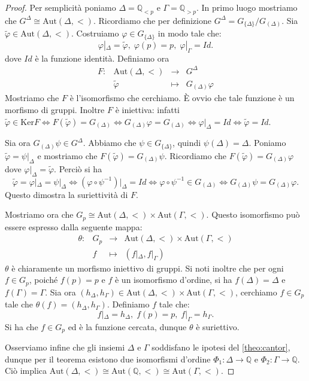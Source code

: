 \documentclass[12pt,a4paper,openright]{report}
\newcommand{\aut}{ \mathrm{Aut} ( \mathbb{Q},< ) } %
\newcommand{\Q}{\mathbb{Q}} %
\newcommand{\0}{\setminus\{0\}} %
\newcommand{\stab}[1]{G_{#1}}   %
\theoremstyle{definition}
\theoremstyle{plain}
\begin{document}
\begin{proof} Per semplicità poniamo $\Delta=\Q_{<p}$ e $\Gamma=\Q_{>p}$.
    In primo luogo mostriamo che $G^{\Delta} \cong \mathrm{Aut} ( \Delta,< )$. Ricordiamo che per definizione $G^{\Delta}=G_{\{\Delta\}} / G_{(\Delta)}$. 
    Sia $\tilde{\varphi} \in \mathrm{Aut} ( \Delta,< )$. Costruiamo $\varphi \in G_{\{\Delta\}}$ in modo tale che:
    \[ \varphi|_{\Delta}=\tilde{\varphi},\; \varphi(p)=p,\; \varphi|_{\Gamma}=Id.\]
    dove $Id$ è la funzione identità. Definiamo ora
    \[\begin{array} {rccc}
        F: & \mathrm{Aut} ( \Delta,< ) &\rightarrow &G^{\Delta} \\ 
        & \tilde{\varphi} & \mapsto & G_{(\Delta)}\varphi
    \end{array}\]
Mostriamo che $F$ è l'isomorfismo che cerchiamo. È ovvio che tale funzione è un morfismo di gruppi.
Inoltre $F$ è iniettiva: infatti $\tilde{\varphi} \in \mathrm{Ker}F \Leftrightarrow F(\tilde{\varphi}) = G_{(\Delta)} \Leftrightarrow G_{(\Delta)}\varphi=G_{(\Delta)} \Leftrightarrow \varphi|_{\Delta}=Id \Leftrightarrow \tilde{\varphi}=Id$.

Sia ora $G_{(\Delta)}\psi \in G^{\Delta}$. Abbiamo che $\psi \in G_{\{\Delta\}}$, quindi ${\psi(\Delta)=\Delta}$. Poniamo $\tilde{\varphi}=\psi|_{\Delta}$ e mostriamo che $F(\tilde{\varphi})=G_{(\Delta)}\psi$.
Ricordiamo che $F(\tilde{\varphi})=G_{(\Delta)}\varphi$ dove $\varphi|_{\Delta}=\tilde{\varphi}$. 
Perciò si ha 
\[{\tilde{\varphi}=\varphi|_{\Delta}=\psi|_{\Delta}} \Leftrightarrow {\left(\varphi \circ \psi^{-1}\right)|_{\Delta}=Id} \Leftrightarrow {\varphi \circ \psi^{-1} \in G_{(\Delta)}} \Leftrightarrow {G_{(\Delta)}\psi=G_{(\Delta)}\varphi}.\]
Questo dimostra la suriettività di $F$.

Mostriamo ora che $\stab{p} \cong \mathrm{Aut}( \Delta,< )\times \mathrm{Aut}( \Gamma,< )$.
Questo isomorfismo può essere espresso dalla seguente mappa:
\[\begin{array} {rccc}
    \theta: & \stab{p} & \rightarrow & \mathrm{Aut} ( \Delta,< )\times \mathrm{Aut} ( \Gamma,< ) \\ 
    & f & \mapsto & \left(f|_{\Delta},f|_{\Gamma}\right)
\end{array}\]
$\theta$ è chiaramente un morfismo iniettivo di gruppi. Si noti inoltre che per ogni $f \in \stab{p}$, poiché $f(p)=p$ e $f$ è un isomorfismo d'ordine, si ha $f(\Delta)=\Delta$ e $f(\Gamma)=\Gamma$. Sia ora  $\left(h_{\Delta}, h_{\Gamma}\right) \in  {\mathrm{Aut} ( \Delta,< )\times \mathrm{Aut} ( \Gamma,< )}$, cerchiamo $f \in \stab{p}$ tale che $\theta(f)=\left(h_{\Delta}, h_{\Gamma}\right)$. Definiamo $f$ tale che:
\[ f|_{\Delta}=h_{\Delta},\; f(p)=p,\; f|_{\Gamma}=h_{\Gamma}.\]
Si ha che $f \in \stab{p}$ ed è la funzione cercata, dunque $\theta$ è suriettivo.

Osserviamo infine che gli insiemi $\Delta$ e $\Gamma$ soddisfano le ipotesi del \cref{theo:cantor}, dunque per il teorema esistono due isomorfismi d'ordine ${\varPhi_1: \Delta \rightarrow \Q}$ e ${\varPhi_2: \Gamma \rightarrow \Q}$. Ciò implica ${\mathrm{Aut} ( \Delta,< )}\cong {\aut} \cong {\mathrm{Aut} ( \Gamma,< )}$.
\end{proof}
\end{document}
